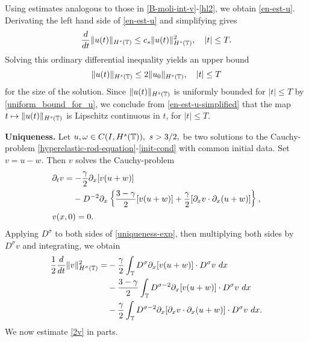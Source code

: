 %
%
Using estimates analogous to those in \eqref{B-moli-int-v}-\eqref{hl2}, we 
obtain \eqref{en-est-u}.
Derivating the left hand side of \eqref{en-est-u} and simplifying gives
%
%
\begin{equation}
\label{en-est-u-simplified}
\frac{d}{dt} \|u(t)\|_{H^s(\mathbb{T})} \le c_s \|u(t)\|_{H^s(\mathbb{T})}^2, \quad |t| 
\le T.
\end{equation}
%
Solving this ordinary differential inequality yields an upper bound
%
%
\begin{equation}
\label{uniform_bound_for_u}
\|u(t)\|_{H^s(\mathbb{T})}
\le
2 \|u_0\|_{H^s(\mathbb{T})},
\quad |t| \le T
\end{equation}
%
%
%
for the size of the solution.  Since $\|u(t)\|_{H^s(\mathbb{T})}$
is uniformly bounded for $|t| \le T$ by
\eqref{uniform_bound_for_u}, we conclude from
\eqref{en-est-u-simplified} that the map $t \mapsto
\|u(t)\|_{H^s(\mathbb{T})}$ is Lipschitz continuous in $t$, for $|t| \le T$. \qquad \qedsymbol
%
%
%

\textbf{Uniqueness.}
%
%
Let $u,\omega \in C(I, H^s(\mathbb{T})), \ s>3/2,$ be two solutions to the
Cauchy-problem \eqref{hyperelastic-rod-equation}-\eqref{init-cond} with
common initial data. Set $v=u-w$. Then $v$ solves the Cauchy-problem
%
%
\begin{align}
	\label{uniqueness-exp}
& \p_t v
=  -\frac{\gamma}{2} \p_x [v(u + w)] 
\\
\notag
& \phantom{\p_t v = }- D^{-2} \p_x \left\{
\frac{3-\gamma}{2}[v(u+w)] + \frac{\gamma}{2}[\p_x v \cdot \p_x (u+w)]
\right\},
\\
& v(x,0) = 0.
\label{uniqueness-init-data}
\end{align}
%
%
%
%
Applying $D^\sigma$ to both sides of \eqref{uniqueness-exp}, then 
multiplying both sides by $D^\sigma v$ and integrating, we obtain
%
%
\begin{equation}
\begin{split}
 \frac{1}{2} \frac{d}{dt} \|v\|_{H^\sigma(\mathbb{T})}^2
 = & -\frac{\gamma}{2} \int_{\mathbb{T}} D^\sigma \partial_x [v(u+w)] \cdot
D^\sigma v \ dx
\\
& - \frac{3-\gamma}{2} \int_{\mathbb{T}}  D^{\sigma -2}
\partial_x[v(u+w)] \cdot
D^\sigma v \ dx  
\\
& - \frac{\gamma}{2} \int_{\mathbb{T}} D^{\sigma 
-2} \partial_x [ \partial_x v
\cdot \partial_x (u+w)]\cdot D^\sigma v \ dx .
\label{2v}
\end{split}
\end{equation}
%
%
We now estimate \eqref{2v} in parts.

